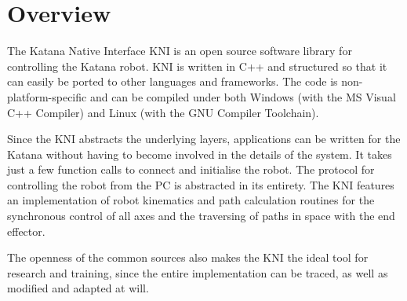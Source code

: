 \chapter{Overview}
The Katana Native Interface KNI is an open source software library for controlling the Katana robot. KNI is written in C++ and structured so that it can easily be ported to other languages and frameworks. The code is non-platform-specific and can be compiled under both Windows (with the MS Visual C++ Compiler) and Linux (with the GNU Compiler Toolchain).\newline

Since the KNI abstracts the underlying layers, applications can be written for the Katana without having to become involved in the details of the system. It takes just a few function calls to connect and initialise the robot. The protocol for controlling the robot from the PC is abstracted in its entirety. The KNI features an implementation of robot kinematics and path calculation routines for the synchronous control of all axes and the traversing of paths in space with the end effector.\newline

The openness of the common sources also makes the KNI the ideal tool for research and training, since the entire implementation can be traced, as well as modified and adapted at will.
